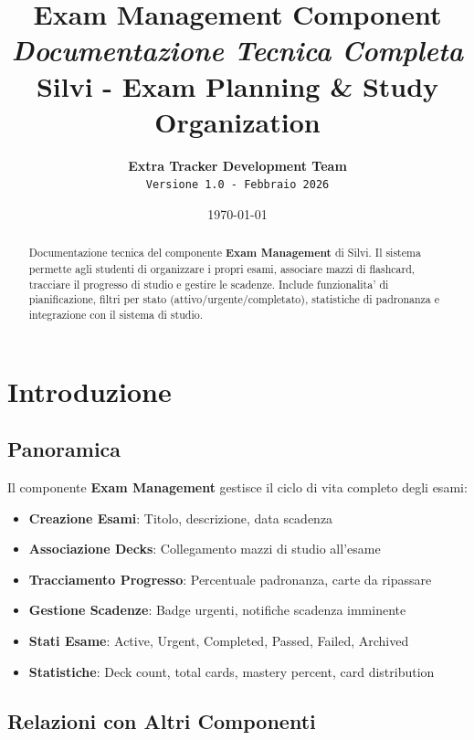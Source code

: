 \documentclass[11pt,a4paper]{article}
\title{
    \Huge\textbf{Exam Management Component}\\[0.5em]
    \Large\textit{Documentazione Tecnica Completa}\\[1em]
    \large Silvi - Exam Planning \& Study Organization
}
\author{
    \textbf{Extra Tracker Development Team}\\
    \texttt{Versione 1.0 - Febbraio 2026}
}
\date{\today}
\begin{document}
\maketitle
\thispagestyle{empty}

\vfill

\begin{abstract}
\noindent
Documentazione tecnica del componente \textbf{Exam Management} di Silvi. Il sistema permette agli studenti di organizzare i propri esami, associare mazzi di flashcard, tracciare il progresso di studio e gestire le scadenze. Include funzionalita' di pianificazione, filtri per stato (attivo/urgente/completato), statistiche di padronanza e integrazione con il sistema di studio.
\end{abstract}

\vfill
\newpage

\tableofcontents
\newpage

\section{Introduzione}\label{sec:intro}

\subsection{Panoramica}

Il componente \textbf{Exam Management} gestisce il ciclo di vita completo degli esami:

\begin{itemize}[leftmargin=*]
    \item \textbf{Creazione Esami}: Titolo, descrizione, data scadenza
    \item \textbf{Associazione Decks}: Collegamento mazzi di studio all'esame
    \item \textbf{Tracciamento Progresso}: Percentuale padronanza, carte da ripassare
    \item \textbf{Gestione Scadenze}: Badge urgenti, notifiche scadenza imminente
    \item \textbf{Stati Esame}: Active, Urgent, Completed, Passed, Failed, Archived
    \item \textbf{Statistiche}: Deck count, total cards, mastery percent, card distribution
\end{itemize}

\subsection{Relazioni con Altri Componenti}
\end{document}
